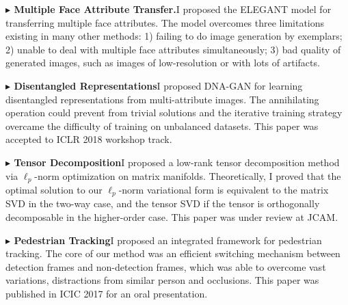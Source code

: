 \documentclass[11pt, a4paper]{article} %
\begin{document}
{\bf $\blacktriangleright$ Multiple Face Attribute Transfer.}\quad I proposed the ELEGANT model for transferring multiple face attributes. The model overcomes three limitations existing in many other methods: 1) failing to do image generation by exemplars; 2) unable to deal with multiple face attributes simultaneously; 3) bad quality of generated images, such as images of low-resolution or with lots of artifacts.

{\bf $\blacktriangleright$ Disentangled Representations}\quad I proposed DNA-GAN for learning disentangled representations from multi-attribute images. The annihilating operation could prevent from trivial solutions and the iterative training strategy overcame the difficulty of training on unbalanced datasets. This paper was accepted to ICLR 2018 workshop track.

{\bf $\blacktriangleright$ Tensor Decomposition}\quad I proposed a low-rank tensor decomposition method via $\ell_p$-norm optimization on matrix manifolds. Theoretically, I proved that the optimal solution to our $\ell_p$-norm variational form is equivalent to the matrix SVD in the two-way case, and the tensor SVD if the tensor is orthogonally decomposable in the higher-order case. This paper was under review at JCAM.

{\bf $\blacktriangleright$ Pedestrian Tracking}\quad I proposed an integrated framework for pedestrian tracking. The core of our method was an efficient switching mechanism between detection frames and non-detection frames, which was able to overcome vast variations, distractions from similar person and occlusions. This paper was published in ICIC 2017 for an oral presentation.
\end{document}

